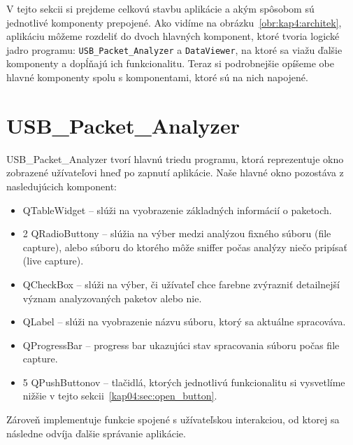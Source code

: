V tejto sekcii si prejdeme celkovú stavbu aplikácie a akým spôsobom sú jednotlivé komponenty prepojené. Ako vidíme na obrázku~\ref{obr:kap4:architek}, aplikáciu môžeme rozdeliť do dvoch hlavných komponent, ktoré tvoria logické jadro programu: \texttt{USB\_Packet\_Analyzer} a \texttt{DataViewer}, na ktoré sa viažu ďalšie komponenty a dopĺňajú ich funkcionalitu. Teraz si podrobnejšie opíšeme obe hlavné komponenty spolu s komponentami, ktoré sú na nich napojené.

\section{USB\_Packet\_Analyzer}

USB\_Packet\_Analyzer tvorí hlavnú triedu programu, ktorá reprezentuje okno zobrazené užívateľovi hneď po zapnutí aplikácie. Naše hlavné okno pozostáva z nasledujúcich komponent:
\begin{itemize}
\item QTableWidget -- slúži na vyobrazenie základných informácií o paketoch.
\item 2 QRadioButtony -- slúžia na výber medzi analýzou fixného súboru (file capture), alebo súboru do ktorého môže sniffer počas analýzy niečo pripísať (live capture).
\item QCheckBox -- slúži na výber, či užívateľ chce farebne zvýrazniť detailnejší význam analyzovaných paketov alebo nie.
\item QLabel -- slúži na vyobrazenie názvu súboru, ktorý sa aktuálne spracováva.
\item QProgressBar -- progress bar ukazujúci stav spracovania súboru počas file capture.
\item 5 QPushButtonov -- tlačidlá, ktorých jednotlivú funkcionalitu si vysvetlíme nižšie v tejto sekcii~\ref{kap04:sec:open_button}.
\end{itemize}
Zároveň implementuje funkcie spojené s užívateľskou interakciou, od ktorej sa následne odvíja ďalšie správanie aplikácie.

